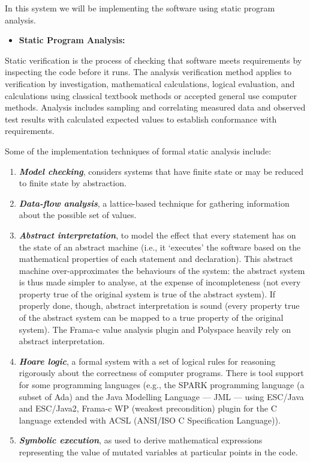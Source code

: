 \documentclass[]{article}
\begin{document}
In this system we will be implementing the software using static program
analysis.

\begin{itemize}

\item
  \textbf{Static Program Analysis:}
\end{itemize}

Static verification is the process of checking that software meets
requirements by inspecting the code before it runs. The analysis
verification method applies to verification by investigation,
mathematical calculations, logical evaluation, and calculations using
classical textbook methods or accepted general use computer methods.
Analysis includes sampling and correlating measured data and observed
test results with calculated expected values to establish conformance
with requirements.

Some of the implementation techniques of formal static analysis include:

\begin{enumerate}
\def\labelenumi{\arabic{enumi}.}
\item
  \emph{\textbf{Model checking}}, considers systems that have finite
  state or may be reduced to finite state by abstraction.
\item
  \emph{\textbf{Data-flow analysis}}, a lattice-based technique for
  gathering information about the possible set of values.
\item
  \emph{\textbf{Abstract interpretation}}, to model the effect that
  every statement has on the state of an abstract machine (i.e., it
  `executes' the software based on the mathematical properties of each
  statement and declaration). This abstract machine over-approximates
  the behaviours of the system: the abstract system is thus made simpler
  to analyse, at the expense of incompleteness (not every property true
  of the original system is true of the abstract system). If properly
  done, though, abstract interpretation is sound (every property true of
  the abstract system can be mapped to a true property of the original
  system). The Frama-c value analysis plugin and Polyspace heavily rely
  on abstract interpretation.
\item
  \emph{\textbf{Hoare logic}}, a formal system with a set of logical
  rules for reasoning rigorously about the correctness of computer
  programs. There is tool support for some programming languages (e.g.,
  the SPARK programming language (a subset of Ada) and the Java
  Modelling Language --- JML --- using ESC/Java and ESC/Java2, Frama-c
  WP (weakest precondition) plugin for the C language extended with ACSL
  (ANSI/ISO C Specification Language)).
\item
  \emph{\textbf{Symbolic execution}}, as used to derive mathematical
  expressions representing the value of mutated variables at particular
  points in the code.
\end{enumerate}
\end{document}
